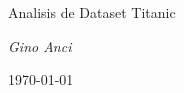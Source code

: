 \documentclass[12pt,a4paper]{report}
\begin{document}
\begin{titlepage}
    \centering
    \vspace*{\fill}
    {\Huge \ttfamily Analisis de Dataset Titanic \par}
    \vspace{2cm}
    {\large \itshape Gino Anci \par}
    {\small\today\par}
    \vspace*{\fill}
\end{titlepage}

\tableofcontents



\end{document}
